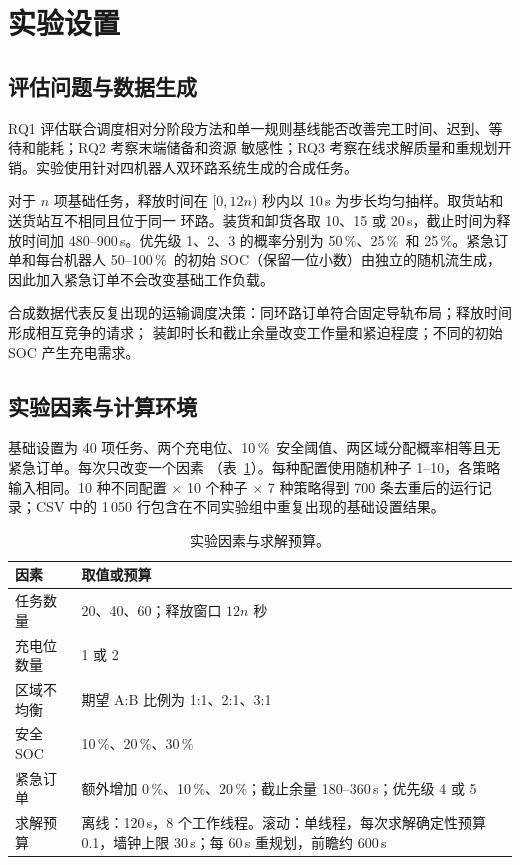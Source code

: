 \documentclass[11pt,a4paper,fontset=none]{ctexart}
\newcommand{\pct}{\,\%}
\begin{document}
\section{实验设置}
\label{sec:setup}

\subsection{评估问题与数据生成}

RQ1 评估联合调度相对分阶段方法和单一规则基线能否改善完工时间、迟到、等待和能耗；RQ2 考察末端储备和资源
敏感性；RQ3 考察在线求解质量和重规划开销。实验使用针对四机器人双环路系统生成的合成任务。

对于 $n$ 项基础任务，释放时间在 $[0, 12n)$ 秒内以 10\,s 为步长均匀抽样。取货站和送货站互不相同且位于同一
环路。装货和卸货各取 10、15 或 20\,s，截止时间为释放时间加 480--900\,s。优先级 1、2、3 的概率分别为
50\pct、25\pct\ 和 25\pct。紧急订单和每台机器人 50--100\pct\ 的初始 SOC（保留一位小数）由独立的随机流生成，
因此加入紧急订单不会改变基础工作负载。

合成数据代表反复出现的运输调度决策：同环路订单符合固定导轨布局；释放时间形成相互竞争的请求；
装卸时长和截止余量改变工作量和紧迫程度；不同的初始 SOC 产生充电需求。

\subsection{实验因素与计算环境}

基础设置为 40 项任务、两个充电位、10\pct\ 安全阈值、两区域分配概率相等且无紧急订单。每次只改变一个因素
（表~\ref{tab:factors}）。每种配置使用随机种子 1--10，各策略输入相同。10 种不同配置 $\times$ 10 个种子
$\times$ 7 种策略得到 700 条去重后的运行记录；CSV 中的 1\,050 行包含在不同实验组中重复出现的基础设置结果。

\begin{table}[!htbp]
\centering\small
\caption{实验因素与求解预算。}
\label{tab:factors}
\begin{tabularx}{\linewidth}{lX}
\toprule
因素 & 取值或预算 \\
\midrule
任务数量 & 20、40、60；释放窗口 $12n$ 秒 \\
充电位数量 & 1 或 2 \\
区域不均衡 & 期望 A:B 比例为 1:1、2:1、3:1 \\
安全 SOC & 10\pct、20\pct、30\pct \\
紧急订单 & 额外增加 0\pct、10\pct、20\pct；截止余量 180--360\,s；优先级 4 或 5 \\
求解预算 & 离线：120\,s，8 个工作线程。滚动：单线程，每次求解确定性预算 0.1，墙钟上限 30\,s；每 60\,s
  重规划，前瞻约 600\,s \\
\bottomrule
\end{tabularx}
\end{table}
\end{document}

